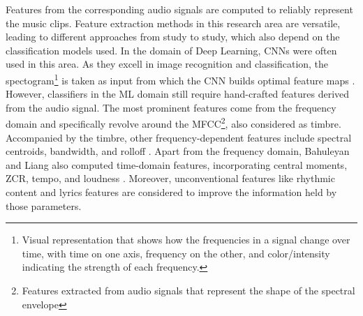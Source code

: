     Features from the corresponding audio signals are computed to reliably represent the music clips. Feature extraction methods in this research area are versatile, leading to different approaches from study to study, which also depend on the classification models used. In the domain of Deep Learning, \acp{CNN} were often used in this area. As they excell in image recognition and classification, the spectogram\footnote{Visual representation that shows how the frequencies in a signal change over time, with time on one axis, frequency on the other, and color/intensity indicating the strength of each frequency.} is taken as input from which the \ac{CNN} builds optimal feature maps \cite{bahuleyan2018music,rotheneder2023explanation}. However, classifiers in the \ac{ML} domain still require hand-crafted features derived from the audio signal. The most prominent features come from the frequency domain and specifically revolve around the \ac{MFCC}\footnote{Features extracted from audio signals that represent the shape of the spectral envelope}, also considered as timbre. Accompanied by the timbre, other frequency-dependent features include spectral centroids, bandwidth, and rolloff \cite{bahuleyan2018music,haggblade2011music,liang2011music,tzanetakis2002musical}. Apart from the frequency domain, Bahuleyan and Liang also computed time-domain features, incorporating central moments, \ac{ZCR}, tempo, and loudness \cite{bahuleyan2018music,liang2011music}. Moreover, unconventional features like rhythmic content \cite{tzanetakis2002musical} and lyrics features \cite{liang2011music} are considered to improve the information held by those parameters. \par


